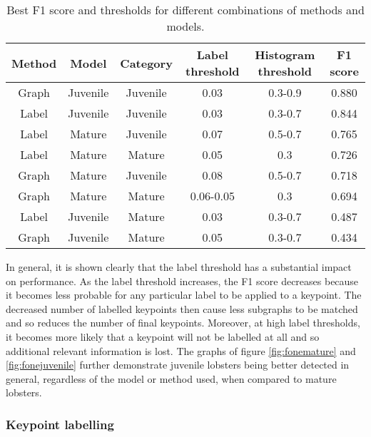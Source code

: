 \begin{table}[H]
\centering
\begin{tabular}{| c | c | c | c | c | c |}
\hline
\textbf{Method} & \textbf{Model} & \textbf{Category} & \textbf{Label threshold} & \textbf{Histogram threshold} & \textbf{F1 score} \\ 
\hline
Graph & Juvenile & Juvenile & 0.03 & 0.3-0.9 & 0.880 \\
\hline
Label & Juvenile & Juvenile & 0.03 & 0.3-0.7 & 0.844 \\
\hline
Label & Mature & Juvenile & 0.07 & 0.5-0.7 & 0.765 \\
\hline
Label & Mature & Mature & 0.05 & 0.3 & 0.726 \\
\hline
Graph & Mature & Juvenile & 0.08 & 0.5-0.7 & 0.718 \\
\hline
Graph & Mature & Mature & 0.06-0.05 & 0.3 & 0.694 \\
\hline
Label & Juvenile & Mature & 0.03 & 0.3-0.7 & 0.487 \\
\hline
Graph & Juvenile & Mature & 0.05 & 0.3-0.7 & 0.434 \\
\hline
\end{tabular}
\caption{Best F1 score and thresholds for different combinations of methods and models.}
\end{table}
\noindent
In general, it is shown clearly that the label threshold has a substantial impact on performance. As the label threshold increases, the F1 score decreases because it becomes less probable for any particular label to be applied to a keypoint. The decreased number of labelled keypoints then cause less subgraphs to be matched and so reduces the number of final keypoints. Moreover, at high label thresholds, it becomes more likely that a keypoint will not be labelled at all and so additional relevant information is lost. 
\n
The graphs of figure \ref{fig:fonemature} and \ref{fig:fonejuvenile} further demonstrate juvenile lobsters being better detected in general, regardless of the model or method used, when compared to mature lobsters. 
\subsubsection{Keypoint labelling}

\newcommand{\fonelabelplot}[6] {
\addplot+[
	discard if not={Method}{#1},
	discard if not={Model}{#2},
	discard if not={Category}{#3},
	discard if not={HistThreshold}{#4},
	discard if not={Label}{#5}
] table [x=LabelThreshold, y=F1, col sep=comma] {\resultspath/kp-labelling.csv};
\addlegendentry{#6}
}

